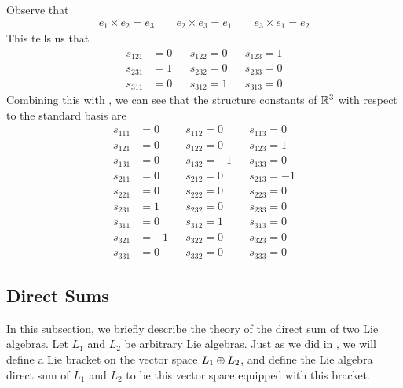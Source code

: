 \begin{boxexample}
    Observe that
    \begin{align*}
        e_1 \times e_2 = e_3 \qquad e_2 \times e_3 = e_1 \qquad e_3 \times e_1 = e_2
    \end{align*}
    This tells us that
    \begin{align*}
            s_{121} &= 0 && s_{122} = 0 && s_{123} = 1 \\
            s_{231} &= 1 && s_{232} = 0 && s_{233} = 0 \\
            s_{311} &= 0 && s_{312} = 1 && s_{313} = 0
    \end{align*}
    Combining this with , we can see that the structure constants of $\mathbb{R}^3$ with respect to the standard basis are
    \begin{align*}
            s_{111} &= 0 && s_{112} = 0 && s_{113} = 0 \\
            s_{121} &= 0 && s_{122} = 0 && s_{123} = 1 \\
            s_{131} &= 0 && s_{132} = -1 && s_{133} = 0 \\
            s_{211} &= 0 && s_{212} = 0 && s_{213} = -1 \\
            s_{221} &= 0 && s_{222} = 0 && s_{223} = 0 \\
            s_{231} &= 1 && s_{232} = 0 && s_{233} = 0 \\
            s_{311} &= 0 && s_{312} = 1 && s_{313} = 0 \\
            s_{321} &= -1 && s_{322} = 0 && s_{323} = 0 \\
            s_{331} &= 0 && s_{332} = 0 && s_{333} = 0
    \end{align*}
\end{boxexample}


\subsection{Direct Sums}

In this subsection, we briefly describe the theory of the direct sum of two Lie algebras. Let $L_1$ and $L_2$ be arbitrary Lie algebras. Just as we did in , we will define a Lie bracket on the vector space $L_1 \oplus L_2$, and define the Lie algebra direct sum of $L_1$ and $L_2$ to be this vector space equipped with this bracket.

